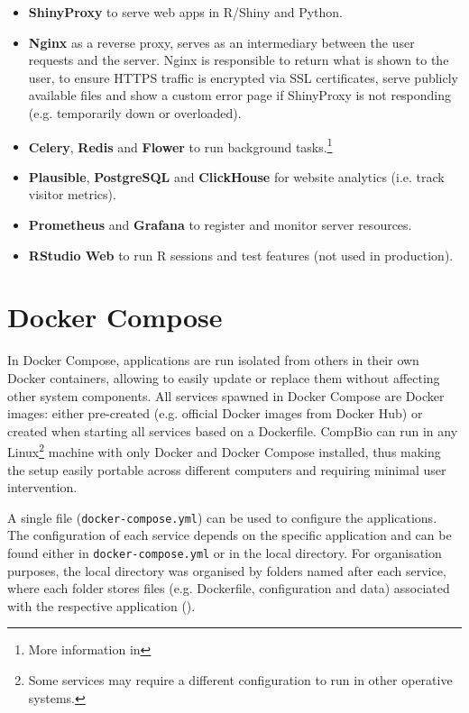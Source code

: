 \begin{itemize}
	\item \textbf{ShinyProxy} to serve web apps in R/Shiny and Python.
	\item \textbf{Nginx} as a reverse proxy, serves as an intermediary between the user requests and the server. Nginx is responsible to return what is shown to the user, to ensure HTTPS traffic is encrypted via SSL certificates, serve publicly available files and show a custom error page if ShinyProxy is not responding (e.g. temporarily down or overloaded).
	\item \textbf{Celery}, \textbf{Redis} and \textbf{Flower} to run background tasks.\footnote{More information in }
	\item \textbf{Plausible}, \textbf{PostgreSQL} and \textbf{ClickHouse} for website analytics (i.e. track visitor metrics).
	\item \textbf{Prometheus} and \textbf{Grafana} to register and monitor server resources.
	\item \textbf{RStudio Web} to run R sessions and test features (not used in production).
\end{itemize}


\section{Docker Compose}

In Docker Compose, applications are run isolated from others in their own Docker containers, allowing to easily update or replace them without affecting other system components. All services spawned in Docker Compose are Docker images: either pre-created (e.g. official Docker images from Docker Hub) or created when starting all services based on a Dockerfile. CompBio can run in any Linux\footnote{Some services may require a different configuration to run in other operative systems.} machine with only Docker and Docker Compose installed, thus making the setup easily portable across different computers and requiring minimal user intervention.

A single file (\texttt{docker-compose.yml}) can be used to configure the applications.  The configuration of each service depends on the specific application and can be found either in \texttt{docker-compose.yml} or in the local directory. For organisation purposes, the local directory was organised by folders named after each service, where each folder stores files (e.g. Dockerfile, configuration and data) associated with the respective application ().

